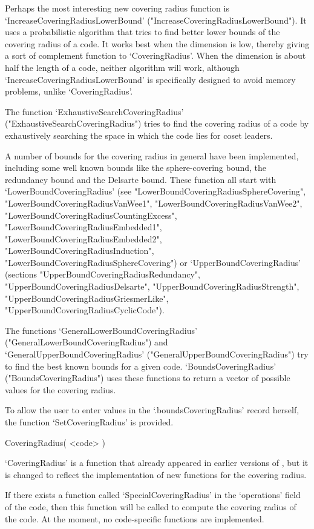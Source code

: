 Perhaps  the  most  interesting   new   covering   radius   function   is
`IncreaseCoveringRadiusLowerBound'  ("IncreaseCoveringRadiusLowerBound").
It uses a probabilistic algorithm that tries to find better lower  bounds
of the covering radius of a code. It works best  when  the  dimension  is
low, thereby giving a sort of complement  function  to  `CoveringRadius'.
When the dimension is about half the length of a code, neither  algorithm
will work, although  `IncreaseCoveringRadiusLowerBound'  is  specifically
designed to avoid memory problems, unlike `CoveringRadius'.

The               function               `ExhaustiveSearchCoveringRadius'
("ExhaustiveSearchCoveringRadius") tries to find the covering radius of a
code by exhaustively searching the space in which the code lies for coset
leaders.

A number of bounds for the covering radius in general have been implemented,
including some well known bounds like the sphere-covering bound,
the redundancy bound and the Delsarte bound.
These function all start with `LowerBoundCoveringRadius'
(see "LowerBoundCoveringRadiusSphereCovering",
"LowerBoundCoveringRadiusVanWee1",
"LowerBoundCoveringRadiusVanWee2",
"LowerBoundCoveringRadiusCountingExcess",
"LowerBoundCoveringRadiusEmbedded1",
"LowerBoundCoveringRadiusEmbedded2",
"LowerBoundCoveringRadiusInduction",
"LowerBoundCoveringRadiusSphereCovering")
or `UpperBoundCoveringRadius'
(sections "UpperBoundCoveringRadiusRedundancy",
"UpperBoundCoveringRadiusDelsarte",
"UpperBoundCoveringRadiusStrength",
"UpperBoundCoveringRadiusGriesmerLike",
"UpperBoundCoveringRadiusCyclicCode").

The              functions              `GeneralLowerBoundCoveringRadius'
("GeneralLowerBoundCoveringRadius") and `GeneralUpperBoundCoveringRadius'
("GeneralUpperBoundCoveringRadius") try to find the best known bounds for
a given code. `BoundsCoveringRadius' ("BoundsCoveringRadius") uses  these
functions to return a vector of possible values for the covering radius.

To allow the user to enter values in the  `.boundsCoveringRadius'  record
herself, the function `SetCoveringRadius' is provided.

\>CoveringRadius( <code> )

`CoveringRadius' is a function that already appeared in earlier
versions of {\GUAVA}, but it is changed to reflect the implementation
of new functions for the covering radius.

If there exists a function called `SpecialCoveringRadius' in the
`operations' field of the code, then this function will be called to
compute the covering radius of the code.
At the moment, no code-specific functions are implemented.

